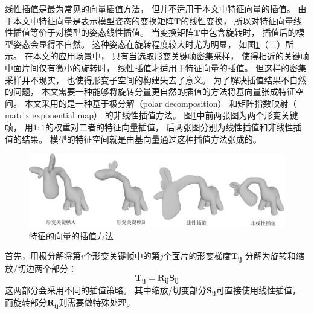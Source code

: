 线性插值是最为常见的向量插值方法，
但并不适用于本文中特征向量的插值。
由于本文中特征向量是表示模型姿态的变换矩阵$\bm{T}$的线性变换，
所以对特征向量线性插值等价于对模型的姿态线性插值。
当变换矩阵$\bm{T}$中包含旋转时，
插值后的模型姿态会显得不自然。
这种姿态在旋转程度较大时尤为明显，
如图\ref{linear_vs_unlinear}（三）所示。
在本文的应用场景中，
只有当选取形变关键帧密集采样，
使得相近的关键帧中面片间仅有微小的旋转时，
线性插值才适用于特征向量的插值。
但这样的密集采样并不现实，
也使得形变子空间的构建失去了意义。
为了解决插值结果不自然的问题，
本文需要一种能够将旋转分量更自然的插值的方法将基向量张成特征空间。
本文采用的是一种基于极分解（polar decomposition）\cite{shoemake1992matrix}
和矩阵指数映射（ matrix exponential map）\cite{murray2017mathematical}
\cite{trove.nla.gov.au/work/222715717}
的非线性插值方法。
图\ref{linear_vs_unlinear}中前两张图为两个形变关键帧，
用$1:1$的权重对二者的特征向量插值，
后两张图分别为线性插值和非线性插值的结果。
模型的特征空间就是由基向量通过这种插值方法张成的。
\begin{figure}
    \centering
    \includegraphics[width = \textwidth]{./Pictures/linear_vs_unlinear.png}
    \caption{特征的向量的插值方法}
    \label{linear_vs_unlinear}
\end{figure}

首先，用极分解将第$i$个形变关键帧中的第$j$个面片的形变梯度$\bm{T_{ij}}$
分解为旋转和缩放/切边两个部分：
\begin{equation}
    \bm{T_{ij}}=\bm{R_{ij}S_{ij}}
\end{equation}
这两部分会采用不同的插值策略。
其中缩放/切变部分$\bm{S_{ij}}$可直接使用线性插值，
而旋转部分$\bm{R_{ij}}$则需要做特殊处理。

